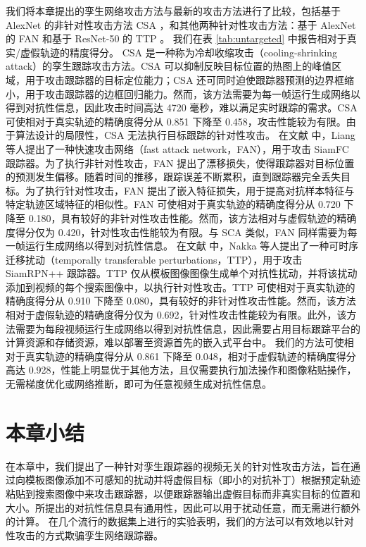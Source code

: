 我们将本章提出的孪生网络攻击方法与最新的攻击方法进行了比较，包括基于 AlexNet 的非针对性攻击方法 CSA \cite{CSA}，和其他两种针对性攻击方法：基于 AlexNet 的 FAN \cite{FAN} 和基于 ResNet-50 的 TTP \cite{TTP}。
我们在表 \ref{tab:untargeted} 中报告相对于真实/虚假轨迹的精度得分。
CSA 是一种称为冷却收缩攻击（cooling-shrinking attack）的孪生跟踪攻击方法。CSA 可以抑制反映目标位置的热图上的峰值区域，用于攻击跟踪器的目标定位能力；CSA 还可同时迫使跟踪器预测的边界框缩小，用于攻击跟踪器的边框回归能力。然而，该方法需要为每一帧运行生成网络以得到对抗性信息，因此攻击时间高达 4720 毫秒，难以满足实时跟踪的需求。CSA 可使相对于真实轨迹的精确度得分从 0.851 下降至 0.458，攻击性能较为有限。由于算法设计的局限性，CSA 无法执行目标跟踪的针对性攻击。
在文献 \cite{FAN} 中，Liang 等人提出了一种快速攻击网络（fast attack network，FAN），用于攻击 SiamFC 跟踪器。为了执行非针对性攻击，FAN 提出了漂移损失，使得跟踪器对目标位置的预测发生偏移。随着时间的推移，跟踪误差不断累积，直到跟踪器完全丢失目标。为了执行针对性攻击，FAN 提出了嵌入特征损失，用于提高对抗样本特征与特定轨迹区域特征的相似性。FAN 可使相对于真实轨迹的精确度得分从 0.720 下降至 0.180，具有较好的非针对性攻击性能。然而，该方法相对与虚假轨迹的精确度得分仅为 0.420，针对性攻击性能较为有限。与 SCA 类似，FAN 同样需要为每一帧运行生成网络以得到对抗性信息。
在文献 \cite{TTP} 中，Nakka 等人提出了一种可时序迁移扰动（temporally transferable perturbations，TTP），用于攻击 SiamRPN++ 跟踪器。TTP 仅从模板图像图像生成单个对抗性扰动，并将该扰动添加到视频的每个搜索图像中，以执行针对性攻击。TTP 可使相对于真实轨迹的精确度得分从 0.910 下降至 0.080，具有较好的非针对性攻击性能。然而，该方法相对于虚假轨迹的精确度得分仅为 0.692，针对性攻击性能较为有限。此外，该方法需要为每段视频运行生成网络以得到对抗性信息，因此需要占用目标跟踪平台的计算资源和存储资源，难以部署至资源首先的嵌入式平台中。
我们的方法可使相对于真实轨迹的精确度得分从 0.861 下降至 0.048，相对于虚假轨迹的精确度得分高达 0.928，性能上明显优于其他方法，且仅需要执行加法操作和图像粘贴操作，无需梯度优化或网络推断，即可为任意视频生成对抗性信息。

\section{本章小结}

在本章中，我们提出了一种针对孪生跟踪器的视频无关的针对性攻击方法，旨在通过向模板图像添加不可感知的扰动并将虚假目标（即小的对抗补丁）根据预定轨迹粘贴到搜索图像中来攻击跟踪器，以便跟踪器输出虚假目标而非真实目标的位置和大小。所提出的对抗性信息具有通用性，因此可以用于扰动任意，而无需进行额外的计算。
在几个流行的数据集上进行的实验表明，我们的方法可以有效地以针对性攻击的方式欺骗孪生网络跟踪器。
